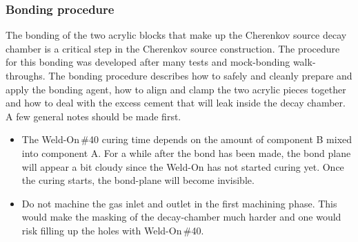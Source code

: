 \subsubsection{Bonding procedure}
\label{chap:bondproc}
The bonding of the two acrylic blocks that make up the Cherenkov source decay chamber is a critical step in the Cherenkov source construction. The procedure for this bonding was developed after many tests and mock-bonding walk-throughs. The bonding procedure describes how to safely and cleanly prepare and apply the bonding agent, how to align and clamp the two acrylic pieces together and how to deal with the excess cement that will leak inside the decay chamber. A few general notes should be made first. 
\begin{itemize}
    \item The Weld-On\,\#40 curing time depends on the amount of component B mixed into component A. For a while after the bond has been made, the bond plane will appear a bit cloudy since the Weld-On has not started curing yet. Once the curing starts, the bond-plane will become invisible.
    \item Do not machine the gas inlet and outlet in the first machining phase. This would make the masking of the decay-chamber much harder and one would risk filling up the holes with Weld-On\,\#40.
\end{itemize}

